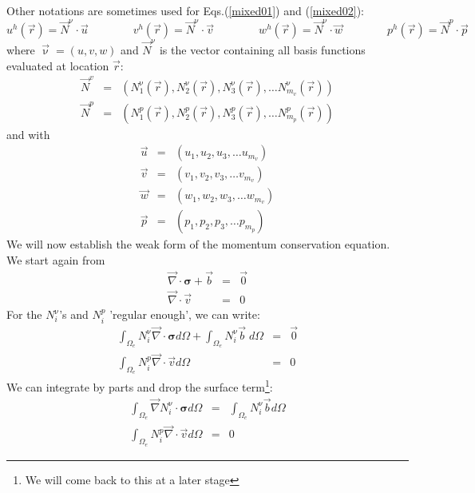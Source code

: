 Other notations are sometimes used for Eqs.(\ref{mixed01}) and (\ref{mixed02}):
\begin{equation}
u^h({\vec r}) = \vec{N}^\upnu \cdot \vec{u}
\quad\quad\quad\quad
v^h({\vec r}) = \vec{N}^\upnu \cdot \vec{v}
\quad\quad\quad\quad
w^h({\vec r}) = \vec{N}^\upnu \cdot \vec{w}
\quad\quad\quad\quad
p^h({\vec r}) = \vec{N}^p \cdot \vec{p}
\end{equation} 
where ${\vec \upnu}=(u,v,w)$ and $\vec{N}^\upnu$ is the vector containing all basis functions evaluated at location ${\vec r}$:
\begin{eqnarray}
\vec{N}^v &=& \left( N_1^\upnu({\vec r}),  N_2^\upnu({\vec r}),  N_3^\upnu({\vec r}), \dots  N_{m_v}^\upnu({\vec r}) \right) \\
\vec{N}^p &=& \left( N_1^p({\vec r}),  N_2^p({\vec r}),  N_3^p({\vec r}), \dots  N_{m_p}^p({\vec r}) \right)
\end{eqnarray}
and with 
\begin{eqnarray}
\vec{u} &=& \left( u_1,  u_2,  u_3, \dots  u_{m_v} \right) \\
\vec{v} &=& \left( v_1,  v_2,  v_3, \dots  v_{m_v} \right) \\
\vec{w} &=& \left( w_1,  w_2,  w_3, \dots  w_{m_v} \right) \\
\vec{p} &=& \left( p_1,  p_2,  p_3, \dots  p_{m_p} \right) 
\end{eqnarray}
We will now establish the weak form of the momentum conservation equation. 
We start again from 
\begin{eqnarray}
{\vec \nabla}\cdot {\bm \sigma} + {\vec b} &=& {\vec 0} \\
{\vec \nabla}\cdot {\vec v} &=& 0
\end{eqnarray}
For the $N_i^\upnu$'s and $N_i^p$ 'regular enough', we can write:
\begin{eqnarray}
\int_{\Omega_e} N_i^\upnu {\vec \nabla}\cdot {\bm \sigma} d\Omega + \int_{\Omega_e} N_i^\upnu  {\vec b} \; d\Omega 
&=& \vec 0 \\
\int_{\Omega_e} N_i^p {\vec \nabla}\cdot {\vec v} d\Omega &=& 0
\end{eqnarray}
We can integrate by parts and drop the surface term\footnote{We will come back to this at a later stage}:
\begin{eqnarray}
\int_{\Omega_e} {\vec \nabla } N_i^\upnu \cdot {\bm \sigma} d\Omega &=& \int_{\Omega_e} N_i^\upnu  {\vec b} d\Omega \\
\int_{\Omega_e} N_i^p {\vec \nabla}\cdot {\vec v} d\Omega &=& 0
\end{eqnarray}

